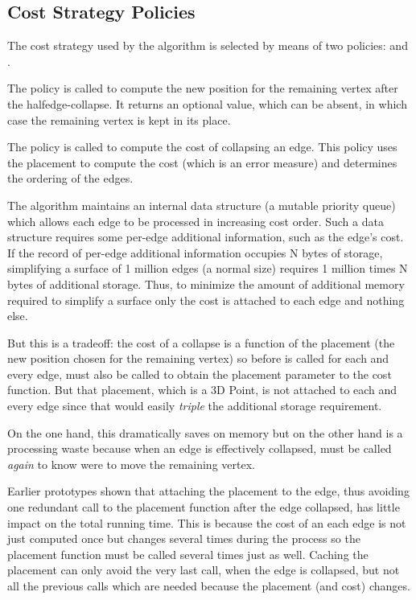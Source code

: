 \subsection{Cost Strategy Policies}

The cost strategy used by the algorithm is selected by means of two policies: 
 and . 

The  policy is called to compute the new position
for the remaining vertex after the halfedge-collapse. It returns
an optional value, which can be absent, in which case the 
remaining vertex is kept in its place.

The  policy is called to compute the cost
of collapsing an edge. This policy uses the placement to compute
the cost (which is an error measure) and determines the 
ordering of the edges.

The algorithm maintains an internal data structure (a mutable priority queue)
which allows each edge to be processed in increasing cost order. Such a data structure
requires some per-edge additional information, such as the edge's cost.
If the record of per-edge additional information occupies N bytes of storage,
simplifying a surface of 1 million edges (a normal size) requires 1 million times N bytes
of additional storage. Thus, to minimize the amount of additional memory required to
simplify a surface only the cost is attached to each edge and nothing else.

But this is a tradeoff: the cost of a collapse is a function of the placement
(the new position chosen for the remaining vertex) so before 
is called for each and every edge,  must also be called to obtain
the placement parameter to the cost function.
But that placement, which is a 3D Point, is not attached to each and every edge since
that would easily {\em triple} the additional storage requirement.

On the one hand, this dramatically saves on memory but on the other hand is
a processing waste because when an edge is effectively collapsed,  
must be called {\em again} to know were to move the remaining vertex.

Earlier prototypes shown that attaching the placement to the edge, thus avoiding one
redundant call to the placement function after the edge collapsed, has little 
impact on the total running time. This is because the cost of an each edge is not just
computed once but changes several times during the process so the placement function
must be called several times just as well. Caching the placement can only avoid the 
very last call, when the edge is collapsed, but not all the previous calls which
are needed because the placement (and cost) changes.

